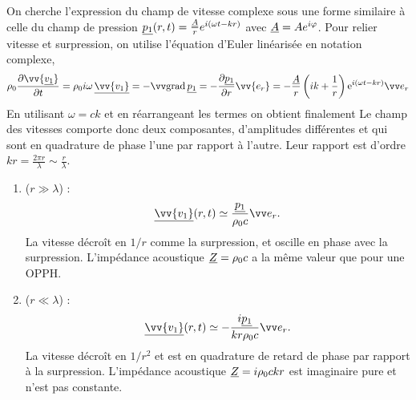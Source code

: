 \documentclass[12pt,fancy]{cours}
\begin{document}

On cherche l'expression du champ de vitesse complexe sous une forme similaire à celle du champ de pression $\underline{p_1}(r,t)=\frac{\underline{A}}{r} e^{i(\omega t -k r)}$ avec $\underline{A}=Ae^{i\varphi}$.
%
Pour relier vitesse et surpression, on utilise l'équation d'Euler linéarisée en notation complexe,
\begin{equation}
\rho_0\frac{\partial\vv{\underline{v_1}}}{\partial t} = \rho_0 i\omega\,\underline{\vv{v_1}} =-\grad \udl{p_1} = -\frac{\partial\underline{p_1}}{\partial r}\vv{e_r} 
=-\frac{\udl{A}}{r}\left(ik+\frac{1}{r}\right)\e^{i(\omega t-kr)}\er
\end{equation}
En utilisant $\omega=ck$ et en réarrangeant les termes on obtient finalement
Le champ des vitesses comporte donc deux composantes, d'amplitudes différentes et qui sont en quadrature de phase l'une par rapport à l'autre. Leur rapport est d'ordre $kr=\frac{2\pi r}{\lambda} \sim \frac{r}{\lambda}$.
\begin{enumerate}
	\item {} ($r\gg\lambda$) :
		\begin{equation}
			\underline{\vv{v_1}}(r,t)\simeq \frac{\udl{p_1}}{\rho_0 c}\er.
		\end{equation}
	La vitesse décroît en $1/r$ comme la surpression, et oscille en phase avec la surpression. L’impédance acoustique $\underline{Z} = \rho_0 c$ a la même valeur que pour une OPPH.
	\item {} ($r\ll\lambda$) :
	\begin{equation}
		\underline{\vv{v_1}}(r,t)\simeq -\frac{i\udl{p_1}}{kr\rho_0 c}\er.
	\end{equation}
	La vitesse décroît en $1/r^2$ et est en quadrature de retard de phase par rapport à la surpression. L’impédance acoustique $\underline{Z} = i\rho_0 c kr$ est imaginaire pure et n’est pas constante.
\end{enumerate}
\end{document}
